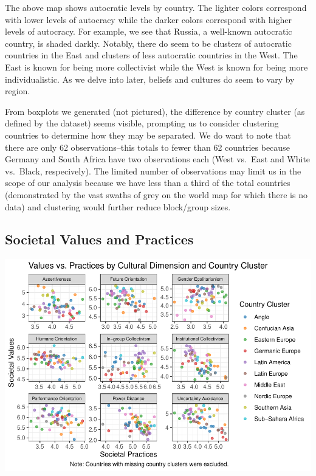 \documentclass[
]{article}
\begin{document}
The above map shows autocratic levels by country. The lighter colors
correspond with lower levels of autocracy while the darker colors
correspond with higher levels of autocracy. For example, we see that
Russia, a well-known autocratic country, is shaded darkly. Notably,
there do seem to be clusters of autocratic countries in the East and
clusters of less autocratic countries in the West. The East is known for
being more collectivist while the West is known for being more
individualistic. As we delve into later, beliefs and cultures do seem to
vary by region.

From boxplots we generated (not pictured), the difference by country
cluster (as defined by the dataset) seems visible, prompting us to
consider clustering countries to determine how they may be separated. We
do want to note that there are only 62 observations--this totals to
fewer than 62 countries because Germany and South Africa have two
observations each (West vs.~East and White vs.~Black, respecively). The
limited number of observations may limit us in the scope of our analysis
because we have less than a third of the total countries (demonstrated
by the vast swaths of grey on the world map for which there is no data)
and clustering would further reduce block/group sizes.

\hypertarget{societal-values-and-practices}{%
\subsection{Societal Values and
Practices}\label{societal-values-and-practices}}

\begin{center}\includegraphics[width=0.85\linewidth]{report_files/figure-latex/society-1} \end{center}
\end{document}
